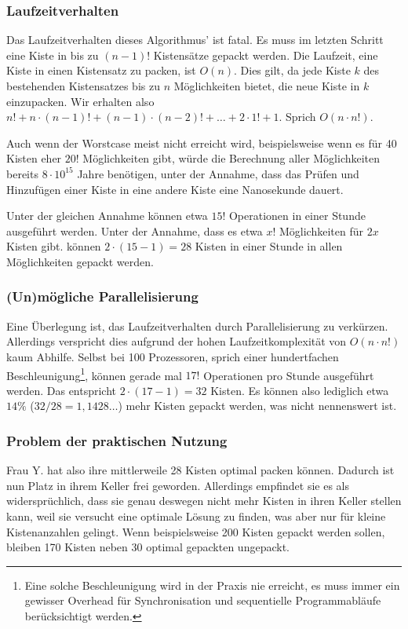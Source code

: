 \subsubsection{Laufzeitverhalten}
 Das Laufzeitverhalten dieses Algorithmus' ist fatal. Es muss im letzten Schritt eine Kiste in bis zu $(n-1)!$ Kistensätze gepackt werden.
 Die Laufzeit, eine Kiste in einen Kistensatz zu packen, ist $O(n)$.
 Dies gilt, da jede Kiste $k$ des bestehenden Kistensatzes bis zu $n$ Möglichkeiten bietet, die neue Kiste in $k$ einzupacken.
 Wir erhalten also $n! + n \cdot (n-1)! +  (n-1) \cdot (n-2)! + \dots + 2 \cdot 1! + 1$. Sprich $O(n \cdot n!)$.

 Auch wenn der Worstcase meist nicht erreicht wird, beispielsweise wenn es für 40 Kisten eher $20!$ Möglichkeiten gibt,
 würde die Berechnung aller Möglichkeiten bereits $8 \cdot 10^{15}$ Jahre benötigen,
  unter der Annahme, dass das Prüfen und Hinzufügen einer Kiste in eine andere Kiste eine Nanosekunde dauert.

 Unter der gleichen Annahme können etwa $15!$ Operationen in einer Stunde ausgeführt werden.
 Unter der Annahme, dass es etwa $x!$ Möglichkeiten für $2x$ Kisten gibt.
 können $2 \cdot (15-1)=28$ Kisten in einer Stunde in allen Möglichkeiten gepackt werden.
\subsubsection{(Un)mögliche Parallelisierung}
 Eine Überlegung ist, das Laufzeitverhalten durch Parallelisierung zu verkürzen.
 Allerdings verspricht dies aufgrund der hohen Laufzeitkomplexität von $O(n \cdot n!)$ kaum Abhilfe.
 Selbst bei 100 Prozessoren, sprich einer hundertfachen Beschleunigung\footnote{Eine solche Beschleunigung wird in der Praxis nie erreicht,
 es muss immer ein gewisser Overhead für Synchronisation und sequentielle Programmabläufe berücksichtigt werden.},
 können gerade mal $17!$ Operationen pro Stunde ausgeführt werden. Das entspricht $2 \cdot (17-1)=32$ Kisten.
 Es können also lediglich etwa $14\%$ ($32/28=1,1428\dots$) mehr Kisten gepackt werden, was nicht nennenswert ist.
\subsubsection{Problem der praktischen Nutzung}
 Frau Y. hat also ihre mittlerweile 28 Kisten optimal packen können. Dadurch ist nun Platz in ihrem Keller frei geworden.
 Allerdings empfindet sie es als widersprüchlich, dass sie genau deswegen nicht mehr Kisten in ihren Keller stellen kann, weil sie versucht eine optimale Lösung zu finden,
  was aber nur für kleine Kistenanzahlen gelingt.
 Wenn beispielsweise 200 Kisten gepackt werden sollen, bleiben 170 Kisten neben 30 optimal gepackten ungepackt.

